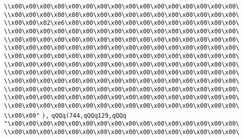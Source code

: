 \verb|\\x00\x00\x00\x00\x00\x00\x00\x00\x00\x00\x00\x00\x00\x00\x00\x00\|\newline
\verb|\\x00\x00\x00\x00\x00\x00\x00\x00\x00\x00\x00\x00\x00\x00\x00\x00\|\newline
\verb|\\x00\x00\x02\xe6\x00\x00\x00\x00\x00\x00\x00\x00\x00\x00\x00\x00\|\newline
\verb|\\x00\x00\x00\x00\x00\x00\x00\x00\x00\x00\x00\x00\x00\x00\x00\x00\|\newline
\verb|\\x00\x00\x00\x00\x00\x00\x00\x00\x00\x00\x00\x00\x00\x00\x00\x00\|\newline
\verb|\\x00\x00\x00\x00\x00\x00\x00\x00\x00\x00\x00\x00\x00\x00\x00\x00\|\newline
\verb|\\x00\x00\x00\x00\x00\x00\x00\x00\x00\x00\x00\x00\x00\x00\x00\x00\|\newline
\verb|\\x00\x00\x00\x00\x00\x00\x00\x00\x00\x00\x00\x00\x00\x00\x00\x00\|\newline
\verb|\\x00\x00\x00\x00\x00\x00\x00\x00\x00\x00\x00\x00\x00\x00\x00\x00\|\newline
\verb|\\x00\x00\x00\x00\x00\x00\x00\x00\x00\x00\x00\x00\x00\x00\x00\x00\|\newline
\verb|\\x00\x00\x00\x00\x00\x00\x00\x00\x00\x00\x00\x00\x00\x00\x00\x00\|\newline
\verb|\\x00\x00\x00\x00\x00\x00\x00\x00\x00\x00\x00\x00\x00\x00\x00\x00\|\newline
\verb|\\x00\x00\x00\x00\x00\x00\x00\x00\x00\x00\x00\x00\x00\x00\x00\x00\|\newline
\verb|\\x00\x00"|\newline
\verb|),|\newline
\verb|qQQq(744,qQQq129,qQQq|\newline
\verb|"\x00\x00\x00\x00\x00\x00\x00\x00\x00\x00\x00\x00\x00\x00\x00\x00\|\newline
\verb|\\x00\x00\x00\x00\x00\x00\x00\x00\x00\x00\x00\x00\x00\x00\x00\x00\|\newline
